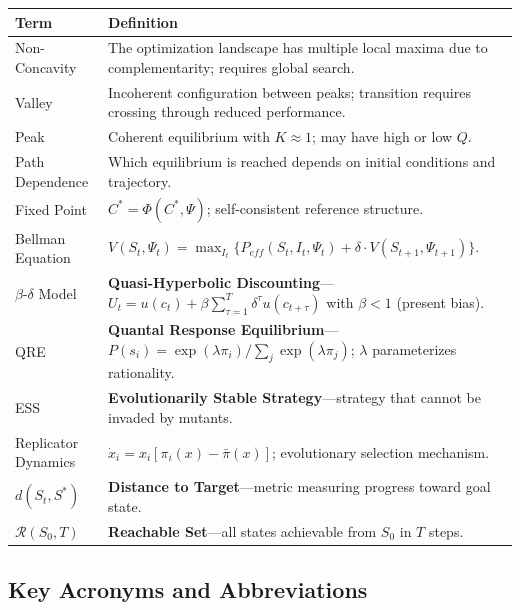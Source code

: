 \begin{longtable}{@{}p{2.8cm}p{10cm}@{}}
\toprule
\textbf{Term} & \textbf{Definition} \\
\midrule
\endhead
Non-Concavity & The optimization landscape has multiple local maxima due to complementarity; requires global search. \\[6pt]
Valley & Incoherent configuration between peaks; transition requires crossing through reduced performance. \\[6pt]
Peak & Coherent equilibrium with $K \approx 1$; may have high or low $Q$. \\[6pt]
Path Dependence & Which equilibrium is reached depends on initial conditions and trajectory. \\[6pt]
Fixed Point & $C^* = \Phi(C^*, \Psi)$; self-consistent reference structure. \\[6pt]
Bellman Equation & $V(S_t, \Psi_t) = \max_{I_t} \{P_{eff}(S_t, I_t, \Psi_t) + \delta \cdot V(S_{t+1}, \Psi_{t+1})\}$. \\[6pt]
$\beta$-$\delta$ Model & \textbf{Quasi-Hyperbolic Discounting}---$U_t = u(c_t) + \beta \sum_{\tau=1}^T \delta^\tau u(c_{t+\tau})$ with $\beta < 1$ (present bias). \\[6pt]
QRE & \textbf{Quantal Response Equilibrium}---$P(s_i) = \exp(\lambda \pi_i) / \sum_j \exp(\lambda \pi_j)$; $\lambda$ parameterizes rationality. \\[6pt]
ESS & \textbf{Evolutionarily Stable Strategy}---strategy that cannot be invaded by mutants. \\[6pt]
Replicator Dynamics & $\dot{x}_i = x_i[\pi_i(x) - \bar{\pi}(x)]$; evolutionary selection mechanism. \\[6pt]
$d(S_t, S^*)$ & \textbf{Distance to Target}---metric measuring progress toward goal state. \\[6pt]
$\mathcal{R}(S_0, T)$ & \textbf{Reachable Set}---all states achievable from $S_0$ in $T$ steps. \\
\bottomrule
\end{longtable}

\subsection{Key Acronyms and Abbreviations}

